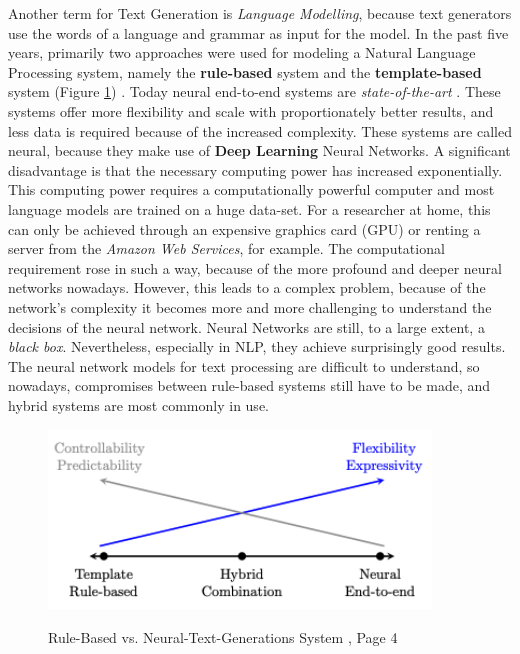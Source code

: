Another term for Text Generation is  \textit{Language Modelling}, because text generators use the words of a language and grammar as input for the model. In the past five years, primarily two approaches were used for modeling a Natural Language Processing system, namely the \textbf{rule-based} system and the \textbf{template-based} system (Figure \ref{rules_based}) \cite{NTG2}. Today neural end-to-end systems are \textit{state-of-the-art} \cite{End_to_End}. These systems offer more flexibility and scale with proportionately better results, and less data is required because of the increased complexity. These systems are called neural, because they make use of \textbf{Deep Learning} Neural Networks.
A significant disadvantage is that the necessary computing power has increased exponentially. This computing power requires a computationally powerful computer and most language models are trained on a huge data-set. For a researcher at home, this can only be achieved through an expensive graphics card (GPU) or renting a server from the  \textit{Amazon Web Services}, for example. The computational requirement rose in such a way, because of the more profound and deeper neural networks nowadays. However, this leads to a complex problem, because of the network's complexity it becomes more and more challenging to understand the decisions of the neural network. Neural Networks are still, to a large extent, a \textit{black box}. Nevertheless, especially in NLP, they achieve surprisingly good results. The neural network models for text processing are difficult to understand, so nowadays, compromises between rule-based systems still have to be made, and hybrid systems are most commonly in use. 


\begin{figure}
  \begin{center}
  \includegraphics[width=4in]{photos/rule_based}\\
  \caption{Rule-Based vs. Neural-Text-Generations System \cite{NTG2}, Page 4}\label{rules_based}
  \end{center}
\end{figure}

